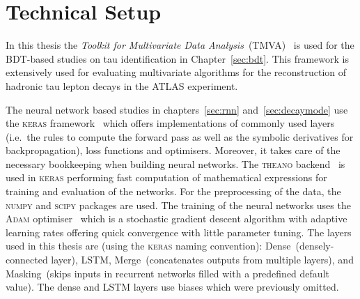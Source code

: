 \section{Technical Setup}
\label{sec:tech_setup}

In this thesis the \emph{Toolkit for Multivariate Data
  Analysis}~(TMVA)~\cite{tmva} is used for the BDT-based studies on tau
identification in Chapter~\ref{sec:bdt}. This framework is extensively used for
evaluating multivariate algorithms for the reconstruction of hadronic tau lepton
decays in the ATLAS experiment.

The neural network based studies in chapters~\ref{sec:rnn}
and~\ref{sec:decaymode} use the \textsc{keras} framework~\cite{keras} which
offers implementations of commonly used layers (i.e.\ the rules to compute the
forward pass as well as the symbolic derivatives for backpropagation), loss
functions and optimisers. Moreover, it takes care of the necessary bookkeeping
when building neural networks. The \textsc{theano} backend~\cite{theano} is used
in \textsc{keras} performing fast computation of mathematical expressions for
training and evaluation of the networks. For the preprocessing of the data, the
\textsc{numpy} \cite{numpy} and \textsc{scipy} \cite{scipy} packages are used.
The training of the neural networks uses the \textsc{Adam} optimiser~\cite{adam}
which is a stochastic gradient descent algorithm with adaptive learning rates
offering quick convergence with little parameter tuning. The layers used in this
thesis are (using the \textsc{keras} naming convention):
Dense~(densely-connected layer), LSTM, Merge~(concatenates outputs from multiple
layers), and Masking~(skips inputs in recurrent networks filled with a
predefined default value). The dense and LSTM layers use biases which were
previously omitted.

